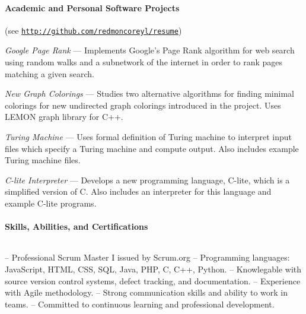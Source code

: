 \documentclass{article}
\begin{document}
  \setlength{\parskip}{0.0in}
  \paragraph{Academic and Personal Software Projects} \hfill (see \href{http://github.com/redmoncoreyl/resume}{\texttt{http://github.com/redmoncoreyl/resume}})%
  \setlength{\parskip}{0.1in}

  \hangindent=0.5in
  \textit{Google Page Rank} --- Implements Google's Page Rank algorithm
  for web search using random walks and a subnetwork of the internet in order to
  rank pages matching a given search.

  \hangindent=0.5in
	\textit{New Graph Colorings} --- Studies two alternative algorithms for
  finding minimal colorings for new undirected graph colorings introduced in the project. Uses LEMON
  graph library for C++.

  \hangindent=0.5in
	\textit{Turing Machine} --- Uses formal definition of Turing machine to
  interpret input files which specify a Turing machine and compute output. Also includes
  example Turing machine files.

  \hangindent=0.5in
	\textit{C-lite Interpreter} --- Develops a new programming language, C-lite, which
  is a simplified version of C. Also includes an interpreter for this language and
  example C-lite programs.

  \paragraph{Skills, Abilities, and Certifications} $ $

  \hangindent=0.4in
  -- Professional Scrum Master I issued by Scrum.org \newline
  -- Programming languages: JavaScript, HTML, CSS, SQL, Java, PHP, C, C++, Python. \newline
  -- Knowlegable with source version control systems, defect tracking, and documentation. \newline
  -- Experience with Agile methodology. \newline
  -- Strong communication skills and ability to work in teams. \newline
  -- Committed to continuous learning and professional development.
\end{document}
